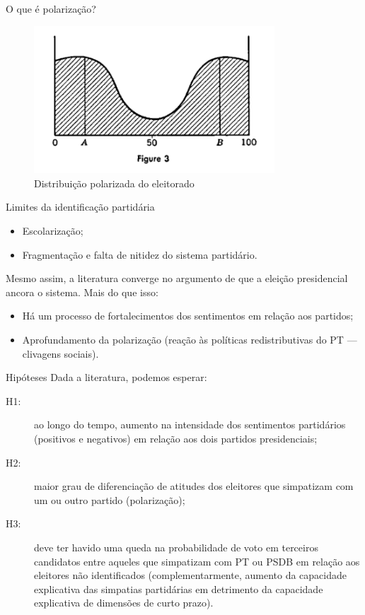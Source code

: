 \documentclass[9pt]{beamer}
\begin{document}
\begin{frame}{O que é polarização?}
    \begin{figure}[h]
        \includegraphics[width=9cm]{images/Downs.png}
        \caption{Distribuição polarizada do eleitorado \cite[~p. 119]{downs}}
    \end{figure}
\end{frame}

\begin{frame}{Limites da identificação partidária}
    \begin{itemize}
        \item Escolarização;
        \item Fragmentação e falta de nitidez do sistema partidário.
    \end{itemize}

    Mesmo assim, a literatura converge no argumento de que a eleição presidencial ancora o sistema. Mais do que isso:

    \begin{itemize}
        \item Há um processo de fortalecimentos dos sentimentos em relação aos partidos;
        \item Aprofundamento da polarização (reação às políticas redistributivas do PT --- clivagens sociais).
    \end{itemize}
\end{frame}

\begin{frame}{Hipóteses}
Dada a literatura, podemos esperar:
    \begin{description}
        \item[H1:] ao longo do tempo, aumento na intensidade dos sentimentos partidários (positivos e negativos) em relação aos dois partidos presidenciais;
        \item[H2:] maior grau de diferenciação de atitudes dos eleitores que simpatizam com um ou outro partido (polarização);
        \item[H3:] deve ter havido uma queda na probabilidade de voto em terceiros candidatos entre aqueles que simpatizam com PT ou PSDB em relação aos eleitores não identificados (complementarmente, aumento da capacidade explicativa das simpatias partidárias em detrimento da capacidade explicativa de dimensões de curto prazo).
    \end{description}
\end{frame}
\end{document}
